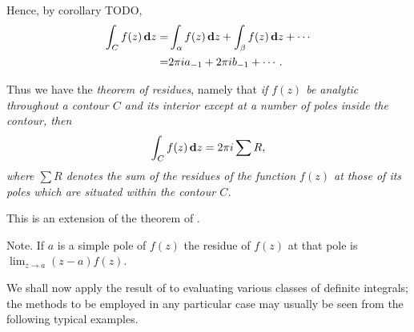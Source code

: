 Hence, by  corollary TODO,
\begin{align*}
  \int_{C} f(z) \, \mathbf{d} z
  =&
  \int_{\alpha} f(z) \, \mathbf{d} z
  + \int_{\beta} f(z) \, \mathbf{d} z
  + \cdots
  \\
  =&
  2\pi i a_{-1} + 2\pi i b_{-1} + \cdots.
\end{align*}

Thus we have the \emph{theorem of residues}, namely that
\emph{if $f(z)$ be analytic throughout a contour $C$ and its interior
  except at a number of poles inside the contour, then
  $$
  \int_{C} f(z) \, \mathbf{d} z = 2\pi i \sum R,
  $$
where $\sum R$ denotes the sum of the residues of the function $f(z)$ at
those of its poles which are situated within the contour $C$.}

This is an extension of the theorem of .

Note. If $a$ is a simple pole of $f(z)$ the residue of $f(z)$ at that pole
is $\lim_{z\rightarrow a} (z-a) f(z)$.


We shall now apply the result of  to evaluating
various classes of definite integrals; the methods to be employed in
any particular case may usually be seen from the following typical
examples.


